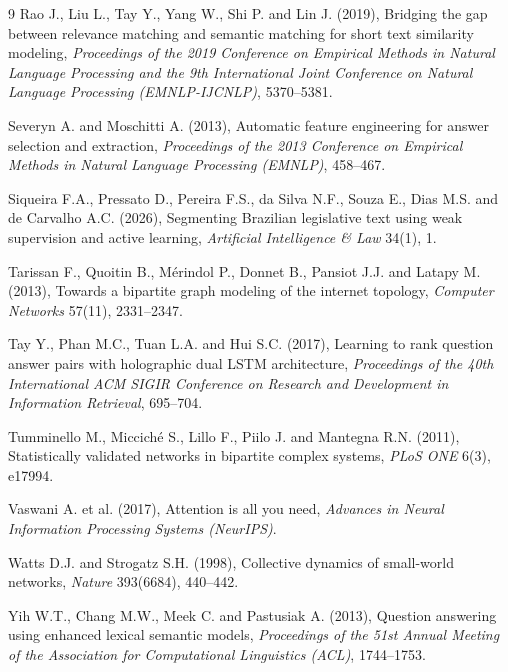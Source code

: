 \documentclass[twoside]{article}
\begin{document}
\begin{thebibliography}{9}
Rao J., Liu L., Tay Y., Yang W., Shi P. and Lin J. (2019), Bridging the gap between relevance matching and semantic matching for short text similarity modeling, {\it Proceedings of the 2019 Conference on Empirical Methods in Natural Language Processing and the 9th International Joint Conference on Natural Language Processing (EMNLP-IJCNLP)}, 5370--5381.

Severyn A. and Moschitti A. (2013), Automatic feature engineering for answer selection and extraction, {\it Proceedings of the 2013 Conference on Empirical Methods in Natural Language Processing (EMNLP)}, 458--467.

Siqueira F.A., Pressato D., Pereira F.S., da Silva N.F., Souza E., Dias M.S. and de Carvalho A.C. (2026), Segmenting Brazilian legislative text using weak supervision and active learning, {\it Artificial Intelligence \& Law} 34(1), 1.

Tarissan F., Quoitin B., M\'{e}rindol P., Donnet B., Pansiot J.J. and Latapy M. (2013), Towards a bipartite graph modeling of the internet topology, {\it Computer Networks} 57(11), 2331--2347.

Tay Y., Phan M.C., Tuan L.A. and Hui S.C. (2017), Learning to rank question answer pairs with holographic dual LSTM architecture, {\it Proceedings of the 40th International ACM SIGIR Conference on Research and Development in Information Retrieval}, 695--704.

Tumminello M., Miccich\'{e} S., Lillo F., Piilo J. and Mantegna R.N. (2011), Statistically validated networks in bipartite complex systems, {\it PLoS ONE} 6(3), e17994.

Vaswani A. et al. (2017), Attention is all you need, {\it Advances in Neural Information Processing Systems (NeurIPS)}.

Watts D.J. and Strogatz S.H. (1998), Collective dynamics of small-world networks, {\it Nature} 393(6684), 440--442.

Yih W.T., Chang M.W., Meek C. and Pastusiak A. (2013), Question answering using enhanced lexical semantic models, {\it Proceedings of the 51st Annual Meeting of the Association for Computational Linguistics (ACL)}, 1744--1753.	
	
	
\end{thebibliography}
 
\end{document}
